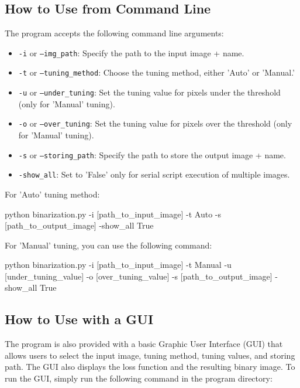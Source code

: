 \subsection{How to Use from Command Line}

The program accepts the following command line arguments:

\begin{itemize}
    \item \texttt{-i} or \texttt{--img\_path}: Specify the path to the input image + name.
    \item \texttt{-t} or \texttt{--tuning\_method}: Choose the tuning method, either 'Auto' or 'Manual.'
    \item \texttt{-u} or \texttt{--under\_tuning}: Set the tuning value for pixels under the threshold (only for 'Manual' tuning).
    \item \texttt{-o} or \texttt{--over\_tuning}: Set the tuning value for pixels over the threshold (only for 'Manual' tuning).
    \item \texttt{-s} or \texttt{--storing\_path}: Specify the path to store the output image + name.
    \item \texttt{-show\_all}: Set to 'False' only for serial script execution of multiple images.
\end{itemize}

\noindent
For 'Auto' tuning method:

\begin{bashscript}
    python binarization.py -i [path_to_input_image] -t Auto -s [path_to_output_image] -show_all True
\end{bashscript}

\noindent
For 'Manual' tuning, you can use the following command:

\begin{bashscript}
    python binarization.py -i [path_to_input_image] -t Manual -u [under_tuning_value] -o [over_tuning_value] -s [path_to_output_image] -show_all True
\end{bashscript}

\subsection{How to Use with a GUI}

The program is also provided with a basic Graphic User Interface (GUI) that allows users to select the input image, tuning method, tuning values, and storing path. The GUI also displays the loss function and the resulting binary image. To run the GUI, simply run the following command in the program directory:

